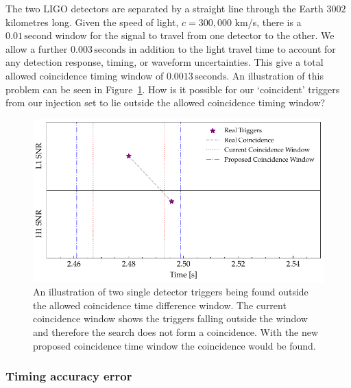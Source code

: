 The two LIGO detectors are separated by a straight line through the Earth $3002$ kilometres long. Given the speed of light, $c = 300,000$ km/s, there is a $0.01 \, \text{second}$ window for the \gwadj signal to travel from one detector to the other. We allow a further $0.003 \, \text{seconds}$ in addition to the light travel time to account for any detection response, timing, or waveform uncertainties. This give a total allowed coincidence timing window of $0.0013 \, \text{seconds}$. An illustration of this problem can be seen in Figure~\ref{6:fig:outside_coinc_window}. How is it possible for our `coincident' triggers from our injection set to lie outside the allowed coincidence timing window?
%
\begin{figure}
    \centering
    \includegraphics[width=\textwidth]{images/6_earlywarning/identified-problems/outside_coinc_window.pdf}
    \caption{An illustration of two single detector triggers being found outside the allowed coincidence time difference window. The current coincidence window shows the triggers falling outside the window and therefore the search does not form a coincidence. With the new proposed coincidence time window the coincidence would be found.}
    \label{6:fig:outside_coinc_window}
\end{figure}
%

\subsubsection{\label{6:sec:timing_error}Timing accuracy error}

